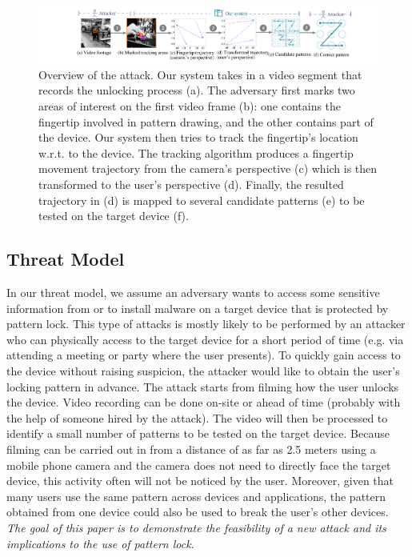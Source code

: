\begin{figure}[!ht]
    \centering
    \includegraphics[width=\textwidth]{fig/overview.pdf}
    \vspace{-4mm}
    \caption{Overview of the attack.
     Our system takes in a video segment that records the unlocking process (a). The adversary first marks two areas of interest on the first video frame (b): one contains the fingertip involved in pattern drawing, and the other contains part of the device. Our system then tries to track the fingertip's location w.r.t. to the device.
     The tracking algorithm produces a fingertip movement trajectory from the camera's perspective (c) which is then transformed to the user's perspective (d). Finally, the resulted trajectory in (d) is mapped to several candidate patterns (e) to be tested on the target device (f). }
    \label{fig:fig2}
    \vspace{-3mm}
\end{figure}

    \subsection{Threat Model}
    \label{sec:scenarios}
        In our threat model, we assume an adversary wants to access some sensitive information from or to install malware on a target device that is protected by pattern lock.
        This type of attacks is mostly likely to be performed by an attacker
         who can physically access to the
        target device for a short period of time (e.g. via  attending a meeting or party where the user presents). To quickly gain access to the device without raising suspicion, the attacker would like to obtain the user's locking pattern in advance.
        The attack starts from filming how the user unlocks the device. Video recording can be done on-site or ahead of time (probably with the help of someone hired by the attack).
        The video will then be processed to identify a small number of patterns to be tested on the target device.
        Because filming can be carried out in from a distance of as far as 2.5 meters using a mobile phone camera and the camera does not need to directly face the target device, this activity often will not be noticed by the user.
        Moreover, given that many users
         use the same pattern across devices and applications, the pattern obtained from one device could also be used to break the user's other devices.  \emph{The goal of this paper is to
        demonstrate the feasibility of a new attack and its implications to
        the use of pattern lock.}

